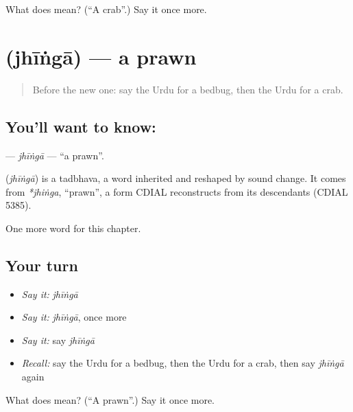 \begin{tcolorbox}[breakable,colback=teal!4,colframe=teal!35!black,title={Before you move on}]
What does  mean? (\textquotedblleft{}A crab\textquotedblright{}.) Say it once more.
\end{tcolorbox}
\section[\texorpdfstring{\ur{جھینگا} (jhīṅgā)}{جھینگا (jhīṅgā)}]{ (jhīṅgā) — a prawn}

\label{lesson:UR-C235-jhinga}



\begin{quote}
Before the new one: say the Urdu for a bedbug, then the Urdu for a crab.
\end{quote}

\subsection*{You'll want to know: }
\textbf{} — \emph{jhīṅgā} — \textquotedblleft{}a prawn\textquotedblright{}.

\begin{cousinweb}
\textbf{} (\emph{jhīṅgā}) is a tadbhava, a word inherited and reshaped by sound change. It comes from \emph{*jhiṅga}, \textquotedblleft{}prawn\textquotedblright{}, a form CDIAL reconstructs from its descendants (CDIAL 5385).
\end{cousinweb}

\begin{grammarlens}[title={What you've built}]
One more word for this chapter.
\end{grammarlens}

\subsection*{Your turn}
\begin{itemize}
\raggedright
  \item \emph{Say it:} \emph{jhīṅgā}
  \item \emph{Say it:} \emph{jhīṅgā}, once more
  \item \emph{Say it:} say \emph{jhīṅgā}
  \item \emph{Recall:} say the Urdu for a bedbug, then the Urdu for a crab, then say \emph{jhīṅgā} again
\end{itemize}

\begin{tcolorbox}[breakable,colback=teal!4,colframe=teal!35!black,title={Before you move on}]
What does  mean? (\textquotedblleft{}A prawn\textquotedblright{}.) Say it once more.
\end{tcolorbox}
